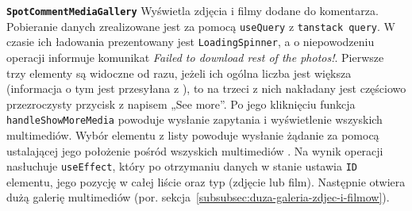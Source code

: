 \textbf{\texttt{SpotCommentMediaGallery}}
Wyświetla zdjęcia i filmy dodane do komentarza.
Pobieranie danych zrealizowane jest za pomocą  \texttt{useQuery} z 
\texttt{tanstack query}.
W czasie ich ładowania prezentowany jest  \texttt{LoadingSpinner}, a o
niepowodzeniu operacji informuje komunikat \emph{Failed to download rest of the photos!}.
Pierwsze trzy elementy są widoczne od razu, jeżeli ich ogólna liczba jest większa
(informacja o tym jest przesyłana z ), to na trzeci z nich nakładany jest częściowo
przezroczysty przycisk z napisem „See more”.
Po jego kliknięciu funkcja \texttt{handleShowMoreMedia} powoduje wysłanie zapytania i wyświetlenie wszyskich multimediów.
Wybór elementu z listy powoduje wysłanie żądanie za pomocą  ustalającej jego położenie
pośród wszyskich multimediów .
Na wynik operacji nasłuchuje  \texttt{useEffect}, który po otrzymaniu danych w stanie
 ustawia \texttt{ID} elementu, jego pozycję w całej liście oraz typ (zdjęcie lub film).
Następnie otwiera dużą galerię multimediów  (por. sekcja~\ref{subsubsec:duza-galeria-zdjec-i-filmow}).

